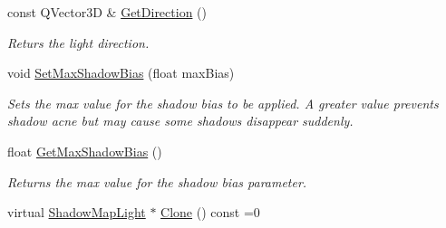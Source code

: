\begin{DoxyCompactItemize}
const Q\+Vector3D \& \mbox{\hyperlink{class_geometry_engine_1_1_geometry_world_item_1_1_geometry_light_1_1_shadow_map_light_a5443fd7c5c2549073841c691f21ba1e4}{Get\+Direction}} ()
\begin{DoxyCompactList}\small\item\em Returs the light direction. \end{DoxyCompactList}\item 
\mbox{\label{class_geometry_engine_1_1_geometry_world_item_1_1_geometry_light_1_1_shadow_map_light_af079c90bd349e7b4c45713271b8ffe2a}} 
void \mbox{\hyperlink{class_geometry_engine_1_1_geometry_world_item_1_1_geometry_light_1_1_shadow_map_light_af079c90bd349e7b4c45713271b8ffe2a}{Set\+Max\+Shadow\+Bias}} (float max\+Bias)
\begin{DoxyCompactList}\small\item\em Sets the max value for the shadow bias to be applied. A greater value prevents shadow acne but may cause some shadows disappear suddenly. \end{DoxyCompactList}\item 
\mbox{\label{class_geometry_engine_1_1_geometry_world_item_1_1_geometry_light_1_1_shadow_map_light_a6e0a525a1d150179e26af0d068e9379e}} 
float \mbox{\hyperlink{class_geometry_engine_1_1_geometry_world_item_1_1_geometry_light_1_1_shadow_map_light_a6e0a525a1d150179e26af0d068e9379e}{Get\+Max\+Shadow\+Bias}} ()
\begin{DoxyCompactList}\small\item\em Returns the max value for the shadow bias parameter. \end{DoxyCompactList}\item 
virtual \mbox{\hyperlink{class_geometry_engine_1_1_geometry_world_item_1_1_geometry_light_1_1_shadow_map_light}{Shadow\+Map\+Light}} $\ast$ \mbox{\hyperlink{class_geometry_engine_1_1_geometry_world_item_1_1_geometry_light_1_1_shadow_map_light_a48eb6af2e6bb8487568ee4265fbc49ee}{Clone}} () const =0
\end{DoxyCompactItemize}
